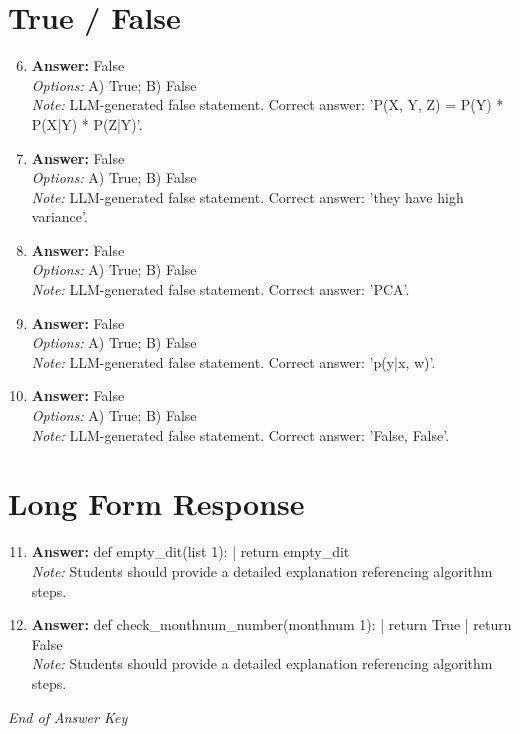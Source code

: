 \documentclass[12pt]{article}
\begin{document}
\section*{True / False}
\begin{enumerate}[label=\arabic*.]
\setcounter{enumi}{5}
\item \textbf{Answer:} False
\\ \textit{Options:} A) True; B) False
\\ \textit{Note:} LLM-generated false statement. Correct answer: 'P(X, Y, Z) = P(Y) * P(X|Y) * P(Z|Y)'.
\item \textbf{Answer:} False
\\ \textit{Options:} A) True; B) False
\\ \textit{Note:} LLM-generated false statement. Correct answer: 'they have high variance'.
\item \textbf{Answer:} False
\\ \textit{Options:} A) True; B) False
\\ \textit{Note:} LLM-generated false statement. Correct answer: 'PCA'.
\item \textbf{Answer:} False
\\ \textit{Options:} A) True; B) False
\\ \textit{Note:} LLM-generated false statement. Correct answer: 'p(y|x, w)'.
\item \textbf{Answer:} False
\\ \textit{Options:} A) True; B) False
\\ \textit{Note:} LLM-generated false statement. Correct answer: 'False, False'.
\end{enumerate}

\section*{Long Form Response}
\begin{enumerate}[label=\arabic*.]
\setcounter{enumi}{10}
\item \textbf{Answer:} def empty\_dit(list 1): | return empty\_dit
\\ \textit{Note:} Students should provide a detailed explanation referencing algorithm steps.
\item \textbf{Answer:} def check\_monthnum\_number(monthnum 1): | return True | return False
\\ \textit{Note:} Students should provide a detailed explanation referencing algorithm steps.
\end{enumerate}

\vfill
\noindent\textit{End of Answer Key}
\end{document}
